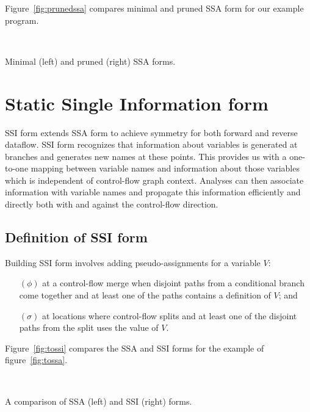 \documentclass[12pt,titlepage,twoside]{article}
\let\oldsection\section
\renewcommand{\section}{\setcounter{figure}{0}\setcounter{table}{0}\oldsection}
\begin{document}
Figure~\vref{fig:prunedssa} compares minimal and pruned SSA form for
our example program.
\begin{myfigure}
\begin{center}
 \vline\ 
\end{center}
\caption[Minimal and pruned SSA forms.]
{Minimal (left) and pruned (right) SSA forms.}
\label{fig:prunedssa}
\end{myfigure}

\section{Static Single Information form}\label{sec:ssi}

SSI form extends SSA form to achieve symmetry for both forward and
reverse dataflow.   SSI form recognizes that information about
variables is generated at branches and generates new names at these
points.  This provides us with a one-to-one mapping between variable
names and information about those variables which is independent of
control-flow graph context.  Analyses can then associate information
with variable names and propagate this information efficiently and
directly both with and against the control-flow direction.

\subsection{Definition of SSI form}\label{sec:ssidef}
Building SSI form involves adding pseudo-assignments for a variable $V$:
\begin{enumerate}
\item[$(\phi)$] at a control-flow merge when disjoint paths from a
conditional branch come together and at least one of the paths
contains a definition of $V$; and
\item[$(\sigma)$] at locations where control-flow splits and at least
one of the disjoint paths from the split uses the value of $V$.
\end{enumerate}

Figure~\vref{fig:tossi} compares the SSA and SSI forms for 
the example of figure~\ref{fig:tossa}.%
\begin{myfigure}
\begin{center}
 \vline\ 
\end{center}
\caption[A comparison of SSA and SSI forms.]
{A comparison of SSA (left) and SSI (right) forms.}
\label{fig:tossi}
\end{myfigure}
\end{document}
